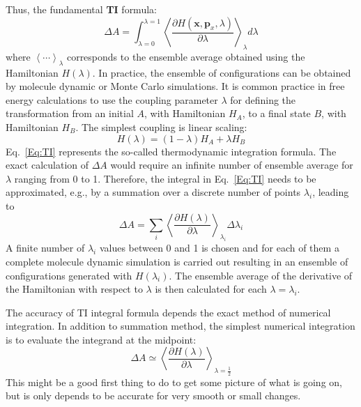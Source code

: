 Thus, the fundamental \textbf{TI} formula:
\begin{equation}
\Delta A = \int_{\lambda=0}^{\lambda=1}\left \langle \frac{\partial{H(\textbf{x},\textbf{p}_{x},\lambda)}}{\partial{\lambda}} \right \rangle_{\lambda} d\lambda
\label{Eq:TI}
\end{equation} 
where $\left \langle \cdots \right \rangle _{\lambda}$ corresponds to the ensemble average obtained using the Hamiltonian $H(\lambda)$. In practice, the ensemble of configurations can be obtained by molecule dynamic or Monte Carlo simulations. It is common practice in free energy calculations to use the coupling parameter $\lambda$ for defining the transformation from an initial $A$, with Hamiltonian $H_{A}$, to a final state $B$, with Hamiltonian $H_{B}$. The simplest coupling is linear scaling:
\begin{equation}
H(\lambda) = (1-\lambda) H_{A} + \lambda H_{B}
\end{equation}
Eq.~\ref{Eq:TI} represents the so-called thermodynamic integration formula. The exact calculation of $\Delta A$ would require an infinite number of ensemble average for $\lambda$ ranging from 0 to 1.
Therefore, the integral in Eq.~\ref{Eq:TI} needs to be approximated, e.g., by a summation over a discrete number of points $\lambda_{i}$,\cite{MordasiniJPCB2000} leading to 
\begin{equation}
\Delta A = \sum_{i}^{}\left \langle \frac{\partial{H(\lambda)}}{\partial{\lambda}} \right \rangle_{\lambda_{i}} \Delta\lambda_{i}
\label{Eq:dTI}
\end{equation} 
A finite number of $\lambda_{i}$ values between 0 and 1 is chosen and for each of them a complete molecule dynamic simulation is carried out resulting in an ensemble of configurations generated with $H(\lambda_{i})$.
The ensemble average of the derivative of the Hamiltonian with respect to $\lambda$ is then calculated for each $\lambda = \lambda_{i}$.
	
The accuracy of TI integral formula depends the exact method of numerical integration. In addition to summation method, the simplest numerical integration is to evaluate the integrand at the midpoint:
\begin{equation}
\Delta A \simeq \left \langle \frac{\partial{H(\lambda)}}{\partial{\lambda}} \right \rangle_{\lambda=\frac{1}{2}}
\label{Eq:TI1}
\end{equation} 
This might be a good first thing to do to get some picture of what is going on, but is only depends to be accurate for very smooth or small changes. %
	
